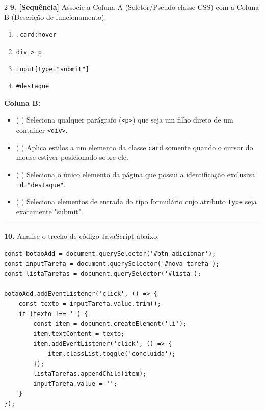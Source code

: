 \documentclass[12pt,a4paper]{article}
\newcommand{\resp}[1]{\iftoggle{gabarito}{\textcolor{corGabarito}{\textbf{#1}}}{\phantom{#1}}}
\begin{document}
\begin{multicols}{2}
\vspace{0.2cm}
\textbf{9. [Sequência]} Associe a Coluna A (Seletor/Pseudo-classe CSS) com a Coluna B (Descrição de funcionamento).
\begin{enumerate}[label=(\arabic*), leftmargin=*]
    \item \texttt{.card:hover}
    \item \texttt{div > p}
    \item \texttt{input[type="submit"]}
    \item \texttt{\#destaque}
\end{enumerate}
\vspace{-0.2cm}
\textbf{Coluna B:}
\begin{itemize}[leftmargin=*, label={}]
    \item ( \resp{2} ) Seleciona qualquer parágrafo (\texttt{<p>}) que seja um filho direto de um container \texttt{<div>}.
    \item ( \resp{1} ) Aplica estilos a um elemento da classe \texttt{card} somente quando o cursor do mouse estiver posicionado sobre ele.
    \item ( \resp{4} ) Seleciona o único elemento da página que possui a identificação exclusiva \texttt{id="destaque"}.
    \item ( \resp{3} ) Seleciona elementos de entrada do tipo formulário cujo atributo \texttt{type} seja exatamente "submit".
\end{itemize}

\end{multicols}

\vspace{0.1cm}
\hrule
\vspace{0.1cm}
\textbf{10.} Analise o trecho de código JavaScript abaixo:
\begin{small}
\begin{verbatim}
const botaoAdd = document.querySelector('#btn-adicionar');
const inputTarefa = document.querySelector('#nova-tarefa');
const listaTarefas = document.querySelector('#lista');

botaoAdd.addEventListener('click', () => {
    const texto = inputTarefa.value.trim();
    if (texto !== '') {
        const item = document.createElement('li');
        item.textContent = texto;
        item.addEventListener('click', () => {
            item.classList.toggle('concluida');
        });
        listaTarefas.appendChild(item);
        inputTarefa.value = '';
    }
});
\end{verbatim}
\end{small}
\end{document}
